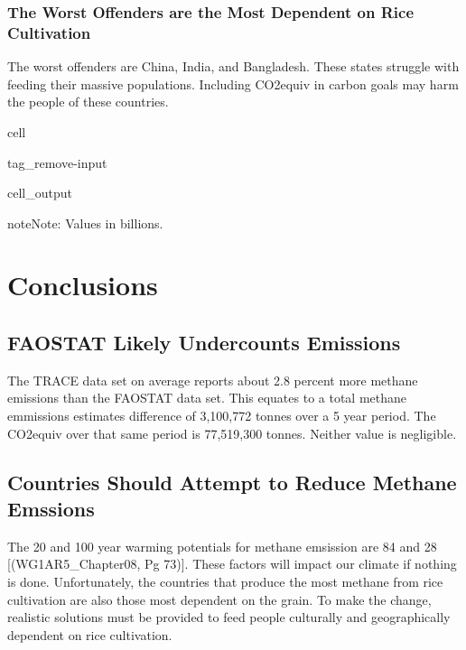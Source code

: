 \documentclass[letterpaper,10pt,english]{jupyterBook}
\begin{document}
\subsubsection{The Worst Offenders are the Most Dependent on Rice Cultivation}
\label{\detokenize{notebooks/hidden_post:the-worst-offenders-are-the-most-dependent-on-rice-cultivation}}
\sphinxAtStartPar
The worst offenders are China, India, and Bangladesh.  These states struggle with feeding their massive populations.  Including CO2equiv in carbon goals may harm the people of these countries.

\begin{sphinxuseclass}{cell}
\begin{sphinxuseclass}{tag_remove-input}\begin{sphinxVerbatimOutput}

\begin{sphinxuseclass}{cell_output}
\noindent{}

\end{sphinxuseclass}\end{sphinxVerbatimOutput}

\end{sphinxuseclass}
\end{sphinxuseclass}
\begin{sphinxadmonition}{note}{Note:}
\sphinxAtStartPar
Values in billions.
\end{sphinxadmonition}


\section{Conclusions}
\label{\detokenize{notebooks/hidden_post:conclusions}}

\subsection{FAOSTAT Likely Undercounts Emissions}
\label{\detokenize{notebooks/hidden_post:faostat-likely-undercounts-emissions}}
\sphinxAtStartPar
The TRACE data set on average reports about 2.8 percent more methane emissions than the FAOSTAT data set.  This equates to a total methane emmissions estimates difference of 3,100,772 tonnes over a 5 year period.  The CO2equiv over that same period is 77,519,300 tonnes.  Neither value is negligible.


\subsection{Countries Should Attempt to Reduce Methane Emssions}
\label{\detokenize{notebooks/hidden_post:countries-should-attempt-to-reduce-methane-emssions}}
\sphinxAtStartPar
The 20 and 100 year warming potentials for methane emsission are 84 and 28 {[}(WG1AR5\_Chapter08, Pg 73){]}.  These factors will impact our climate if nothing is done.  Unfortunately, the countries that produce the most methane from rice cultivation are also those most dependent on the grain.  To make the change, realistic solutions must be provided to feed people culturally and geographically dependent on rice cultivation.
\end{document}
